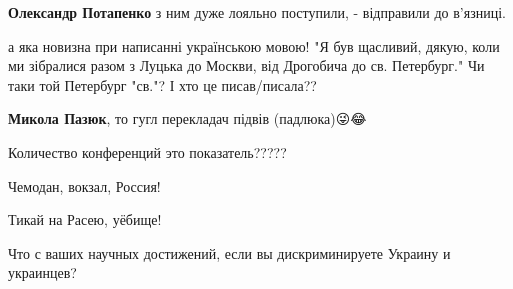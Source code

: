 \begin{itemize}
\begin{itemize}
\textbf{Олександр Потапенко} з ним дуже лояльно поступили, - відправили до в'язниці.
\end{itemize}

 

а яка новизна при написанні українською мовою! "Я був щасливий, дякую, коли ми
зібралися разом з Луцька до Москви, від Дрогобича до св. Петербург." Чи таки
той Петербург "св."? І хто це писав/писала??

\begin{itemize}
 
\textbf{Микола Пазюк}, то гугл перекладач підвів (падлюка)😜😂
\end{itemize}

 
Количество конференций это показатель?????

 
Чемодан, вокзал, Россия!

 
Тикай на Расею, уёбище!

 

Что с ваших научных достижений, если вы дискриминируете Украину и украинцев?


\end{itemize}
